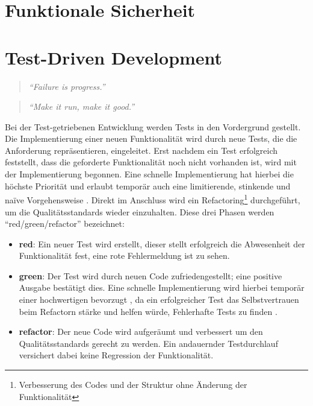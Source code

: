 	
	
	
\section{Funktionale Sicherheit}
\label{com:safety}
	
\section{Test-Driven Development}

\begin{quotation}
	\textit{\enquote{Failure is progress.}}
	\cite[5]{tdd}
\end{quotation}
\begin{quotation}
	\textit{\enquote{Make it run, make it good.}}
	\cite[24]{tdd}
\end{quotation}

Bei der Test-getriebenen Entwicklung werden Tests in den Vordergrund gestellt.
Die Implementierung einer neuen Funktionalität wird durch neue Tests, die die Anforderung repräsentieren, eingeleitet.
Erst nachdem ein Test erfolgreich feststellt, dass die geforderte Funktionalität noch nicht vorhanden ist, wird mit der Implementierung begonnen.
Eine schnelle Implementierung hat hierbei die höchste Priorität und erlaubt temporär auch eine limitierende, stinkende und naïve Vorgehensweise \cite[7]{tdd}.
Direkt im Anschluss wird ein Refactoring\footnote{Verbesserung des Codes und der Struktur ohne Änderung der Funktionalität} durchgeführt, um die Qualitätsstandards wieder einzuhalten.
Diese drei Phasen werden \enquote{red/green/refactor} bezeichnet:

\begin{itemize}
	\item \textbf{red}: Ein neuer Test wird erstellt, dieser stellt erfolgreich die Abwesenheit der Funktionalität fest, eine rote Fehlermeldung ist zu sehen.
	\item \textbf{green}: Der Test wird durch neuen Code zufriedengestellt; eine positive Ausgabe bestätigt dies. Eine schnelle Implementierung wird hierbei temporär einer hochwertigen bevorzugt \cite[24]{tdd}, da ein erfolgreicher Test das Selbstvertrauen beim Refactorn stärke und helfen würde, Fehlerhafte Tests zu finden \cite[152]{tdd}.
	\item \textbf{refactor}: Der neue Code wird aufgeräumt und verbessert um den Qualitätsstandards gerecht zu werden. Ein andauernder Testdurchlauf versichert dabei keine Regression der Funktionalität.
\end{itemize}

